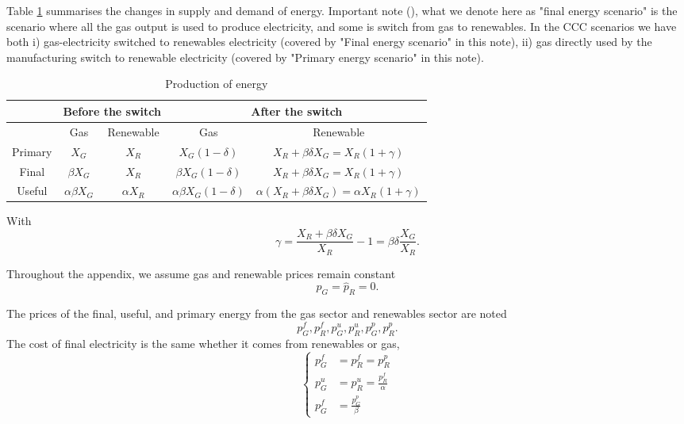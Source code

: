 \documentclass[11pt]{article}
\begin{document}
 
 
 Table \ref{tab_summary_energy_prod} summarises the changes in supply and demand of energy.
 Important note (), what we denote here as "final energy scenario" is the scenario where all the gas output is used to produce electricity, and some is switch from gas to renewables. In the CCC scenarios we have both i) gas-electricity switched to renewables electricity (covered by "Final energy scenario" in this note), ii) gas directly used by the manufacturing switch to renewable electricity (covered by "Primary energy scenario" in this note).  


\begin{table}[H]
\centering
\begin{tabular}{@{}c|cc|cc@{}}
\toprule
        & \multicolumn{2}{c|}{Before the switch} & \multicolumn{2}{c}{After the switch} \\ \midrule
        & Gas             & Renewable            & Gas            & Renewable           \\ \midrule
Primary &     $X_G$   &    $X_R$    &  $X_G(1-\delta)$  & $X_R+\beta\delta X_G=X_R(1+\gamma)$               \\
Final   &      $\beta X_G$              &  $X_R$                      &          $\beta X_G (1-\delta)$        &        $X_R+\beta\delta X_G=X_R(1+\gamma)$               \\
Useful&  $\alpha\beta X_G$              & $\alpha X_R$                      &          $\alpha\beta X_G (1-\delta)$        &        $\alpha(X_R+\beta\delta X_G)=\alpha X_R(1+\gamma)$                   \\ \bottomrule
\end{tabular}
\caption{Production of energy}
\label{tab_summary_energy_prod}
\end{table}

With 
\begin{equation*}
    \gamma=\frac{X_R+\beta\delta X_G}{X_R}-1=\beta\delta\frac{X_G}{X_R}.
\end{equation*}

Throughout the appendix, we assume gas and renewable prices remain constant
\begin{equation*}
    \hat{p}_G=\hat{p}_R=0.
\end{equation*}


The prices of the final, useful, and primary energy from the gas sector and renewables sector are noted
\[p_G^f, p_R^f,p_G^u, p_R^u,p_G^p, p_R^p. \]
The cost of final electricity is the same whether it comes from renewables or gas, 
\begin{equation}
\label{eq:price_elec}
\begin{cases}
     p_G^f&=p_R^f=p_R^p\\
      p_G^u&=p_R^u=\frac{p_R^f}{\alpha}\\
    p_G^f&=\frac{p_G^p}{\beta}
\end{cases}
\end{equation}
\end{document}
